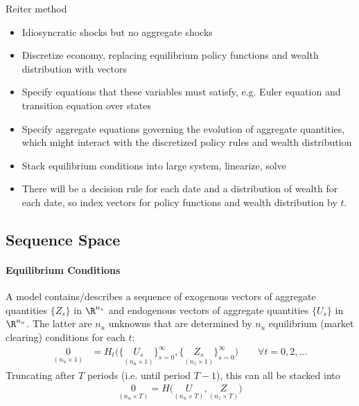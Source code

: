 \documentclass[12pt]{article}
\theoremstyle{plain}
\theoremstyle{definition}
\theoremstyle{remark}
\begin{document}
Reiter method
\begin{itemize}
  \item Idiosyncratic shocks but no aggregate shocks
  \item Discretize economy, replacing equilibrium policy functions and
    wealth distribution with vectors
  \item Specify equations that these variables must satisfy, e.g.
    Euler equation and transition equation over states
  \item Specify aggregate equations governing the evolution of aggregate
    quantities, which might interact with the discretized policy rules
    and wealth distribution
  \item Stack equilibrium conditions into large system, linearize, solve
  \item There will be a decision rule for each date and a distribution
    of wealth for each date, so index vectors for policy functions and
    wealth distribution by $t$.
\end{itemize}






\clearpage
\subsection{Sequence Space}

\paragraph{Equilibrium Conditions}
A model contains/describes a sequence of exogenous vectors of aggregate
quantities $\{Z_s\}$ in $\R^{n_z}$ and endogenous vectors of aggregate
quantities $\{U_s\}$ in $\R^{n_u}$.
The latter are $n_u$ unknowns that are determined by $n_u$ equilibrium
(market clearing) conditions for each $t$:
\begin{align*}
  \underset{(n_u\times 1)}{0}
  &=
  H_t\big(
    \{
    \underset{(n_u\times 1)}{U_s}
    \}_{s=0}^\infty
  ,
    \{
    \underset{(n_z\times 1)}{Z_s}
    \}_{s=0}^\infty
  \big)
  \qquad
  \forall t=0,2,\ldots
\end{align*}
Truncating after $T$ periods (i.e. until period $T-1$), this can all be
stacked into
\begin{align}
  \underset{(n_u\times T)}{0}
  =
  H\big(
  \underset{(n_u\times T)}{U}
  ,
  \underset{(n_z \times T)}{Z}
  \big)
  \label{eqconds}
\end{align}
\end{document}
